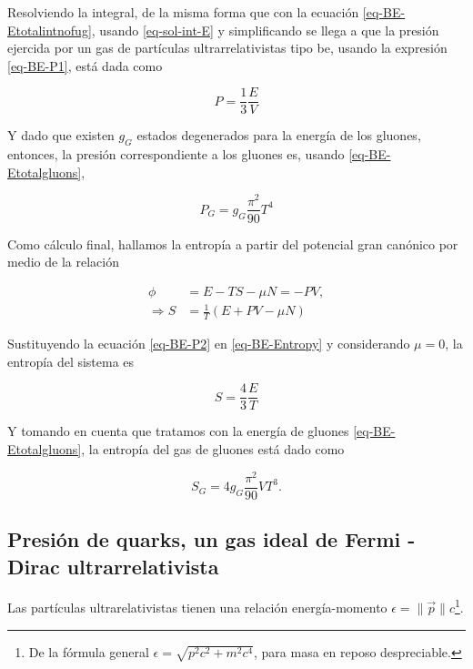Resolviendo la integral, de la misma forma que con la ecuación \eqref{eq-BE-Etotalintnofug}, usando \eqref{eq-sol-int-E} y simplificando se llega a que la presión ejercida por un gas de partículas ultrarrelativistas tipo \acrshort{be}, usando la expresión \eqref{eq-BE-P1}, está dada como

\begin{equation}\label{eq-BE-P2}
P= \frac{1}{3} \frac{E}{V}
\end{equation}

Y dado que existen ${g}_{G}$ estados degenerados para la energía de los gluones, entonces, la presión correspondiente a los gluones es, usando \eqref{eq-BE-Etotalgluons},

\begin{equation}\label{eq-BE-Pgluons}
{P}_{G} = {g}_{G} \frac{{\pi}^{2}}{90}{T}^{4}
\end{equation}

Como cálculo final, hallamos la entropía a partir del potencial gran canónico por medio de la relación

\begin{equation}\label{eq-BE-Entropy}
\begin{split}
\phi &= E-TS-\mu N = -PV, \\
\Rightarrow S & = \frac{1}{T} \left(E+PV- \mu N \right)
\end{split}
\end{equation}

Sustituyendo la ecuación \eqref{eq-BE-P2} en \eqref{eq-BE-Entropy} y considerando $\mu=0$, la entropía del sistema es

\begin{equation}\label{eq-BE-S}
S = \frac{4}{3} \frac{E}{T}
\end{equation}

Y tomando en cuenta que tratamos con la energía de gluones \eqref{eq-BE-Etotalgluons}, la entropía del gas de gluones está dado como

\begin{equation}\label{eq-BE-Sgluons}
{S}_{G} = 4{g}_{G} \frac{{\pi}^{2}}{90}V{T}^{3}.
\end{equation}

\subsection{Presión de quarks, un gas ideal de Fermi - Dirac ultrarrelativista}\label{sec-Pquarks}

Las partículas ultrarelativistas tienen una relación energía-momento $\epsilon = \| \overrightarrow{p} \| c$\footnote{De la fórmula general $\epsilon = \sqrt{{p}^{2}{c}^{2} + {m}^{2}{c}^{4}}$, para masa en reposo despreciable.}.

